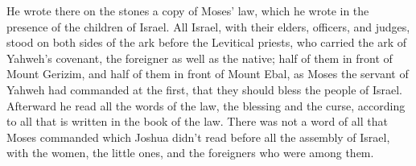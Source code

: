 {He wrote there on the stones a copy of Moses’ law, which he wrote in the presence of the children of Israel.
All Israel, with their elders, officers, and judges, stood on both sides of the ark before the Levitical priests, who carried the ark of Yahweh’s covenant, the foreigner as well as the native; half of them in front of Mount Gerizim, and half of them in front of Mount Ebal, as Moses the servant of Yahweh had commanded at the first, that they should bless the people of Israel.
Afterward he read all the words of the law, the blessing and the curse, according to all that is written in the book of the law.
There was not a word of all that Moses commanded which Joshua didn’t read before all the assembly of Israel, with the women, the little ones, and the foreigners who were among them.

}
